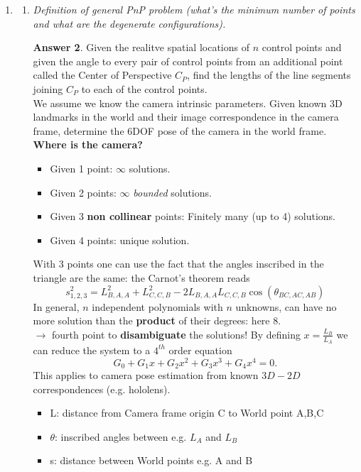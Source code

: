 \documentclass[a4paper,12 pt]{article}
\theoremstyle{definition}
\theoremstyle{remark}
\theoremstyle{definition}
\theoremstyle{definition}
\theoremstyle{definition}
\theoremstyle{definition}
\theoremstyle{remark}
\theoremstyle{remark}
\theoremstyle{definition}
\theoremstyle{definition}
\newtheorem*{answer}{Answer}
\begin{document}
\begin{enumerate}
\begin{enumerate}
\begin{answer}
\end{answer}
\item \textit{Normalized image coordinates and geometric explanation.}
\end{enumerate}
\item \begin{enumerate}
\item \textit{Definition of general PnP problem (what’s the minimum number of points and what are the degenerate configurations).}
\begin{answer}
Given the realitve spatial locations of $n$ control points and given the angle to every pair of control points from an additional point called the Center of Perspective $C_P$, find the lengths of the line segments joining $C_P$ to each of the control points.\\
We assume we know the camera intrinsic parameters. Given known 3D landmarks in the world and their image correspondence in the camera frame, determine the 6DOF pose of the camera in the world frame. \textbf{Where is the camera?}
\begin{itemize}
\item Given 1 point: $\infty$ solutions.
\item Given 2 points: $\infty$ \textit{bounded} solutions.
\item Given 3 \textbf{non collinear} points: Finitely many (up to 4) solutions.
\item Given 4 points: unique solution.
\end{itemize}
With 3 points one can use the fact that the angles inscribed in the triangle are the same: the Carnot's theorem reads
\begin{equation}
s_{1,2,3}^2=L_{B,A,A}^2+L_{C,C,B}^2-2L_{B,A,A}L_{C,C,B}\cos(\theta_{BC,AC,AB})
\end{equation}
In general, $n$ independent polynomials with $n$ unknowns, can have no more solution than the \textbf{product} of their degrees: here 8. \\
$\rightarrow$ fourth point to \textbf{disambiguate} the solutions! By defining $x=\frac{L_B}{L_A}$ we can reduce the system to a $4^{th}$ order equation
\begin{equation}
G_0+G_1x+G_2x^2+G_3x^3+G_4x^4=0.
\end{equation}
This applies to camera pose estimation from known $3D-2D$ correspondences (e.g. hololens).
\begin{itemize}
\item L: distance from Camera frame origin C to World point A,B,C
\item $\theta$: inscribed angles between e.g.  $L_A$ and $L_B$
\item s: distance between World points e.g. A and B
\end{itemize}
\end{answer}


\end{enumerate}
\end{enumerate}
\end{document}
